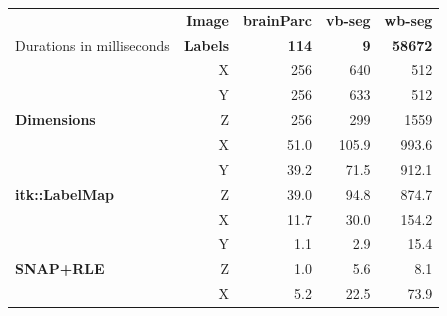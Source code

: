 \documentclass{InsightArticle}
\begin{document}
\begin{table}[h]
	\centering
		\begin{tabular}{lrrrr}
																																& \textbf{Image}           & \textbf{brainParc}          & \textbf{vb-seg}             & \textbf{wb-seg}              \\
		\multirow{-2}{2cm}{Durations in milliseconds}                  & \textbf{Labels}          & \textbf{114}                & \textbf{9}                  & \textbf{58672}               \\
																																& X                        & 256                         & 640                         & 512                          \\
																																& Y                        & 256                         & 633                         & 512                          \\
		\multirow{-3}{*}{\textbf{Dimensions}}                        & Z                        & 256                         & 299                         & 1559                         \\
																																& X                        & 51.0                        & 105.9                       & 993.6                        \\
																																& Y                        & 39.2                        & 71.5                        & 912.1                        \\
		\multirow{-3}{*}{\textbf{itk::LabelMap}}                     & Z                        & 39.0                        & 94.8                        & 874.7                        \\
		{\color[HTML]{036400} }                                      & {\color[HTML]{036400} X} & {\color[HTML]{036400} 11.7} & {\color[HTML]{036400} 30.0} & {\color[HTML]{036400} 154.2} \\
		{\color[HTML]{036400} }                                      & {\color[HTML]{036400} Y} & {\color[HTML]{036400} 1.1}  & {\color[HTML]{036400} 2.9}  & {\color[HTML]{036400} 15.4}  \\
		\multirow{-3}{*}{{\color[HTML]{036400} \textbf{SNAP+RLE}}}   & {\color[HTML]{036400} Z} & {\color[HTML]{036400} 1.0}  & {\color[HTML]{036400} 5.6}  & {\color[HTML]{036400} 8.1}   \\
		{\color[HTML]{9A0000} }                                      & {\color[HTML]{9A0000} X} & {\color[HTML]{9A0000} 5.2}  & {\color[HTML]{9A0000} 22.5} & {\color[HTML]{9A0000} 73.9}  \\

\end{tabular}
\end{table}
\end{document}
